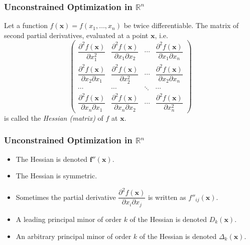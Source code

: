 \documentclass[10pt]{beamer}
\theoremstyle{definition}
\begin{document}
\begin{frame}[fragile]
\frametitle{Unconstrained Optimization in $ \mathbb{R}^n $}
Let a function $ f(\mathbf{x})=f(x_1,\ldots,x_n) $ be twice differentiable. The matrix of second partial derivatives, evaluated at a point $ \mathbf{x} $, i.e. \[ \begin{pmatrix}
\dfrac{\partial^2 f(\mathbf{x})}{\partial x_1^2 } & \dfrac{\partial^2 f(\mathbf{x})}{\partial x_1 \partial x_2} & \cdots & \dfrac{\partial^2 f(\mathbf{x})}{\partial x_1 \partial x_n}\\[3ex]
\dfrac{\partial^2 f(\mathbf{x})}{\partial x_2\partial x_1 } & \dfrac{\partial^2 f(\mathbf{x})}{\partial x_2^2} & \cdots & \dfrac{\partial^2 f(\mathbf{x})}{\partial x_2 \partial x_n}\\[3ex]
\cdots & \cdots & \ddots & \cdots \\[3ex]
\dfrac{\partial^2 f(\mathbf{x})}{\partial x_n \partial x_1 } & \dfrac{\partial^2 f(\mathbf{x})}{\partial x_n \partial x_2 } & \cdots & \dfrac{\partial^2 f(\mathbf{x})}{\partial x_n^2}
\end{pmatrix} \] is called the \emph{Hessian (matrix)} of $ f $ at $ \mathbf{x} $.
\end{frame}

\begin{frame}[fragile]
\frametitle{Unconstrained Optimization in $ \mathbb{R}^n $}
\begin{itemize}
\item The Hessian is denoted $ \mathbf{f''(x)} $. \bigskip
\item The Hessian is symmetric. \bigskip
\item Sometimes the partial derivative $ \dfrac{\partial^2 f(\mathbf{x})}{\partial x_i \partial x_j} $ is written as $ f''_{ij}(\mathbf{x}) $. \bigskip
\item A leading principal minor of order $ k $ of the Hessian is denoted $ D_k(\mathbf{x}) $. \bigskip
\item An arbitrary principal minor of order $ k $ of the Hessian is denoted $ \Delta_k(\mathbf{x}) $.
\end{itemize}

\end{frame}
\end{document}
